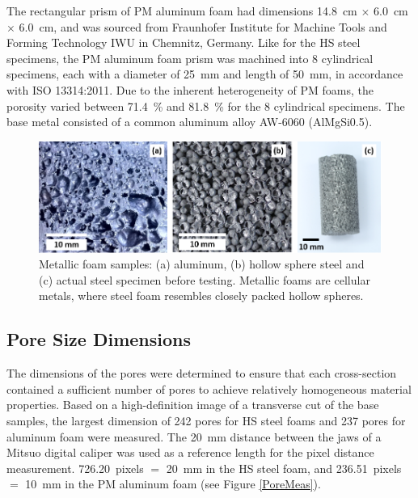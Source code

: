 \documentclass[review]{elsarticle}
\begin{document}
The rectangular prism of PM aluminum foam had dimensions 14.8~cm $\times$ 6.0~cm $\times$ 6.0~cm, and was sourced from Fraunhofer Institute for Machine Tools and Forming Technology IWU in Chemnitz, Germany. Like for the HS steel specimens, the PM aluminum foam prism was machined into 8 cylindrical specimens, each with a diameter of 25~mm and length of 50~mm, in accordance with ISO 13314:2011. Due to the inherent heterogeneity of PM foams, the porosity varied between 71.4~\% and 81.8~\% for the 8 cylindrical specimens. The base metal consisted of a common aluminum alloy AW-6060 (AlMgSi0.5).

\begin{figure}[htbp]
	\begin{center}
		\includegraphics[width=0.95\linewidth]{Tex-Figures/Fig01a_b_c.png}
		\caption{Metallic foam samples: (a) aluminum, (b) hollow sphere steel and (c) actual steel specimen before testing. Metallic foams are cellular metals, where steel foam resembles closely packed hollow spheres.}
		\label{Samples}
	\end{center}
\end{figure}

\subsection*{Pore Size Dimensions}

The dimensions of the pores were determined to ensure that each cross-section contained a sufficient number of pores to achieve relatively homogeneous material properties. Based on a high-definition image of a transverse cut of the base samples, the largest dimension of 242 pores for HS steel foams and 237 pores for aluminum foam were measured. The 20~mm distance between the jaws of a Mitsuo digital caliper was used as a reference length for the pixel distance measurement. 726.20~pixels $=$ 20~mm in the HS steel foam, and 236.51~pixels $=$ 10~mm in the PM aluminum foam (see Figure \ref{PoreMeas}).
\end{document}
